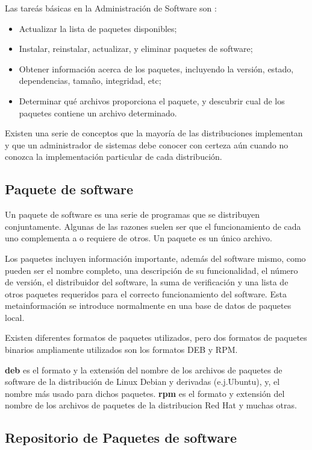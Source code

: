 \documentclass[12pt]{article}
\begin{document}
Las tareás básicas en la Administración de Software son :
\begin{itemize}
\item Actualizar la lista de paquetes disponibles;
\item Instalar, reinstalar, actualizar, y eliminar paquetes de software;
\item Obtener información acerca de los paquetes, incluyendo la versión, estado, dependencias, tamaño, integridad, etc;
\item Determinar qué archivos proporciona el paquete, y descubrir cual de los paquetes contiene un archivo determinado.
\end{itemize}

Existen una serie de conceptos que la 
mayoría de las distribuciones implementan y que un administrador de 
sistemas debe conocer con certeza aún cuando no conozca la implementación
particular de cada distribución.  


\subsection*{Paquete de software}


Un paquete de software es una serie de programas que se distribuyen conjuntamente. Algunas de las razones suelen ser que el funcionamiento de cada uno complementa a o requiere de otros. Un paquete es un único archivo.

Los paquetes incluyen información importante, además del software mismo, como pueden ser el nombre completo, una descripción de su funcionalidad, el número de versión, el distribuidor del software, la suma de verificación y una lista de otros paquetes requeridos para el correcto funcionamiento del software. Esta metainformación se introduce normalmente en una base de datos de paquetes local.

Existen diferentes formatos de paquetes utilizados, pero 
dos formatos de paquetes binarios ampliamente utilizados son los formatos DEB y RPM.

{\bf deb} es el formato y la extensión del nombre de los archivos de paquetes de software de la distribución de Linux Debian y derivadas (e.j.Ubuntu), y, el nombre más usado para dichos paquetes. 
{\bf rpm} es el formato y extensión del nombre de los archivos de paquetes de la distribucion Red Hat y muchas otras.


\subsection*{Repositorio de Paquetes de software}
\end{document}
